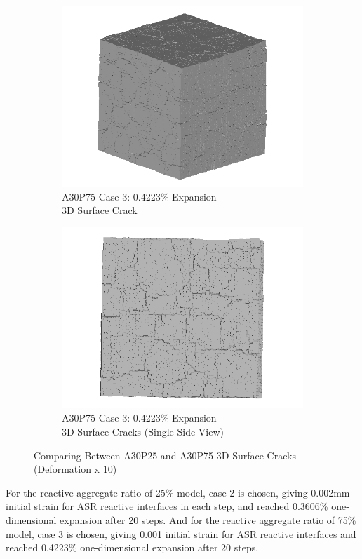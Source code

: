 \begin{figure}[ht!]
\begin{subfigure}{.5\textwidth}
    \end{subfigure}
    \begin{subfigure}{.5\textwidth}
      \centering
      \includegraphics[width=.8\linewidth]{Files/exp_3D/ASR/A30P75_3_3d.png}
    \caption{A30P75 Case 3: 0.4223\% Expansion\\ 3D Surface Crack}
    \end{subfigure}%
    \begin{subfigure}{.5\textwidth}
      \centering
      \includegraphics[width=.8\linewidth]{Files/exp_3D/ASR/A30P75_3_3ds.png}
    \caption{A30P75 Case 3: 0.4223\% Expansion\\ 3D Surface Cracks (Single Side View)}
    \end{subfigure}

  \caption{Comparing Between A30P25 and A30P75 3D Surface Cracks (Deformation x 10)}
  \label{fig:ASR_A30P25vsA30P75_3D}
\end{figure}


For the reactive aggregate ratio of 25\% model, case 2 is chosen, giving 0.002mm initial strain for ASR reactive interfaces in each step, and reached 0.3606\% one-dimensional expansion after 20 steps. And for the reactive aggregate ratio of 75\% model, case 3 is chosen, giving 0.001 initial strain for ASR reactive interfaces and reached 0.4223\% one-dimensional expansion after 20 steps.

